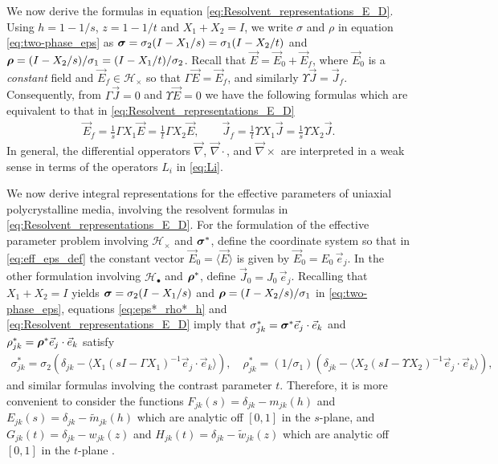\documentclass[11pt]{amsart}
\newcommand\bsig{\mbox{\boldmath${\sigma}$}}
\newcommand\brho{\mbox{\boldmath${\rho}$}}
\begin{document}
We now derive the formulas in equation
\eqref{eq:Resolvent_representations_E_D}.
Using $h=1-1/s$, $z=1-1/t$ and $X_1+X_2=I$, we write $\sigma$ and $\rho$ in  
equation \eqref{eq:two-phase_eps} as $\bsig=\sigma_2(I-X_1/s)=\sigma_1(I-X_2/t)$ and
$\brho=(I-X_2/s)/\sigma_1=(I-X_1/t)/\sigma_2$. Recall that
$\vec{E}=\vec{E}_0+\vec{E}_f$, where $\vec{E}_0$ is a \emph{constant}
field and $\vec{E}_f\in\mathscr{H}_\times$ so that
$\Gamma\vec{E}=\vec{E}_f$, and similarly
$\Upsilon\vec{J}=\vec{J}_f$. Consequently, from $\Gamma\vec{J}=0$ and $\Upsilon\vec{E}=0$
we have the following formulas which are equivalent to that in 
\eqref{eq:Resolvent_representations_E_D}  
% 
\begin{align}\label{eq:Proj_rep_Ef_Jf}
  \vec{E}_f=\frac{1}{s}\Gamma X_1\vec{E}=\frac{1}{t}\Gamma X_2\vec{E}, \qquad
  \vec{J}_f=\frac{1}{t}\Upsilon X_1\vec{J}=\frac{1}{s}\Upsilon X_2\vec{J}.
\end{align}
%
In general, the differential opperators $\vec{\nabla}$, $\vec{\nabla}\cdot$, and
$\vec{\nabla}\times$ are interpreted
in a weak sense in terms of the operators $L_i$ in \eqref{eq:Li}.




We now derive integral representations for the effective parameters
of uniaxial polycrystalline media, involving the resolvent formulas in
\eqref{eq:Resolvent_representations_E_D}. 
For the formulation of the effective parameter
problem involving $\mathscr{H}_\times$ and $\bsig^*$, define the
coordinate system so that in \eqref{eq:eff_eps_def} the constant
vector $\vec{E}_0=\langle\vec{E}\rangle$ is given by
$\vec{E}_0=E_0\,\vec{e}_j$. In the other formulation involving
$\mathscr{H}_\bullet$ and $\brho^*$, define
$\vec{J}_0=J_0\,\vec{e}_j$. Recalling that $X_1+X_2=I$ yields
$\bsig=\sigma_2(I-X_1/s)$ and $\brho=(I-X_2/s)/\sigma_1$ in
\eqref{eq:two-phase_eps}, equations \eqref{eq:eps*_rho*_h} and
\eqref{eq:Resolvent_representations_E_D} 
imply that $\sigma^*_{jk}=\bsig^*\vec{e}_j\cdot\vec{e}_k$ and 
$\rho^*_{jk}=\brho^*\vec{e}_j\cdot\vec{e}_k$  satisfy
%
\begin{align}\label{eq:Eff_Cond_Tens_Def}
  \sigma^*_{jk}=\sigma_2(\delta_{jk}-\langle X_1(sI-\Gamma X_1)^{-1}\vec{e}_j\cdot\vec{e}_k\rangle) ,
                \quad
  \rho^*_{jk}=(1/\sigma_1)(\delta_{jk}-\langle X_2(sI-\Upsilon X_2)^{-1}\vec{e}_j\cdot\vec{e}_k\rangle), 
\end{align}
%
and similar formulas involving the contrast parameter $t$.
Therefore, it is more convenient to consider the functions 
$F_{jk}(s)=\delta_{jk}-m_{jk}(h)$ and $E_{jk}(s)=\delta_{jk}-\tilde{m}_{jk}(h)$
which are analytic off $[0,1]$ in the $s$-plane, and
$G_{jk}(t)=\delta_{jk}-w_{jk}(z)$ and $H_{jk}(t)=\delta_{jk}-\tilde{w}_{jk}(z)$
which are analytic off $[0,1]$ in the $t$-plane
\cite{Golden:CMP-473}.
\end{document}
